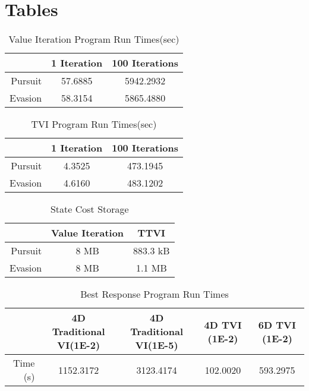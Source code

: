 \chapter{Tables}

\begin{table}
\caption{Value Iteration Program Run Times(sec)}
\label{4dVIrt}
\begin{center}
\begin{tabular}{||r|c|c||}\hline
  & 1 Iteration & 100 Iterations \\\hline
Pursuit & 57.6885 & 5942.2932 \\\hline
Evasion & 58.3154 & 5865.4880 \\\hline
\end{tabular}
\end{center}
\end{table}

\begin{table}
\caption{TVI Program Run Times(sec)}
\label{4dTTVIrt}
\begin{center}
\begin{tabular}{||r|c|c||}\hline
  & 1 Iteration & 100 Iterations \\\hline
Pursuit & 4.3525 & 473.1945 \\\hline
Evasion & 4.6160 & 483.1202 \\\hline
\end{tabular}
\end{center}
\end{table}

\begin{table}
\caption{State Cost Storage}
\label{4dstore}
\begin{center}
\begin{tabular}{||r|c|c||}\hline
  & Value Iteration & TTVI \\\hline
Pursuit & 8 MB & 883.3 kB \\\hline
Evasion & 8 MB & 1.1 MB \\\hline
\end{tabular}
\end{center}
\end{table}

\begin{table}
\caption{Best Response Program Run Times}
\label{BRRun}
\begin{center}
\begin{tabular}{||r|c|c|c|c||}\hline
  & 4D Traditional VI(1E-2) & 4D Traditional VI(1E-5) & 4D TVI (1E-2) & 6D TVI (1E-2)\\\hline
Time (s) & 1152.3172 & 3123.4174 & 102.0020 & 593.2975 \\\hline

\end{tabular}
\end{center}
\end{table}

\clearpage
\newpage

